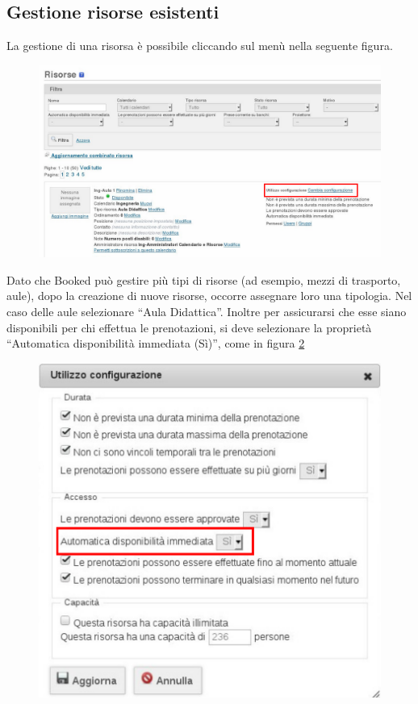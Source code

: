 \newpage
\subsection{Gestione risorse esistenti}
La gestione di una risorsa è possibile cliccando sul menù nella seguente figura.


\begin{figure}[H]
\centering{}\includegraphics[scale=0.5]{Immagini/risorsa_selezione_configurazione.pdf}
\normalsize
\caption{}
\label{fig:risorsa_selezione_configurazione.pdf}
\end{figure}

Dato che Booked può gestire più tipi di risorse (ad esempio, mezzi di trasporto, aule),
dopo la creazione di nuove risorse, occorre assegnare loro una tipologia. Nel caso delle
aule selezionare ``Aula Didattica''.
Inoltre per assicurarsi che esse siano disponibili per chi effettua le prenotazioni,
si deve selezionare la proprietà ``Automatica disponibilità immediata (Sì)'', come in figura
\ref{fig:risorsa_configurazione_proprieta_disponibilita.pdf}

\begin{figure}[H]
\centering{}\includegraphics[scale=0.7]{Immagini/risorsa_configurazione_proprieta_disponibilita.pdf}
\normalsize
\caption{}
\label{fig:risorsa_configurazione_proprieta_disponibilita.pdf}
\end{figure}

